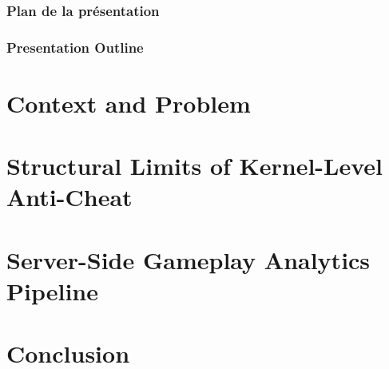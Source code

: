\documentclass[compress,usepdftitle=false]{beamer}
\begin{document}
\begin{frame}
  \titlepage
\end{frame}

\begin{frame}
 {\frametitle{Plan de la présentation}}
 {\frametitle{Presentation Outline}}
\tableofcontents
\end{frame}

% 


\section[Context and Problem]{Context and Problem}


\section[Structural Limits of Kernel-Level Anti-Cheat]{Structural Limits of Kernel-Level Anti-Cheat}


\section[Server-Side Gameplay Analytics Pipeline]{Server-Side Gameplay Analytics Pipeline}


\section[Conclusion]{Conclusion}

\end{document}
